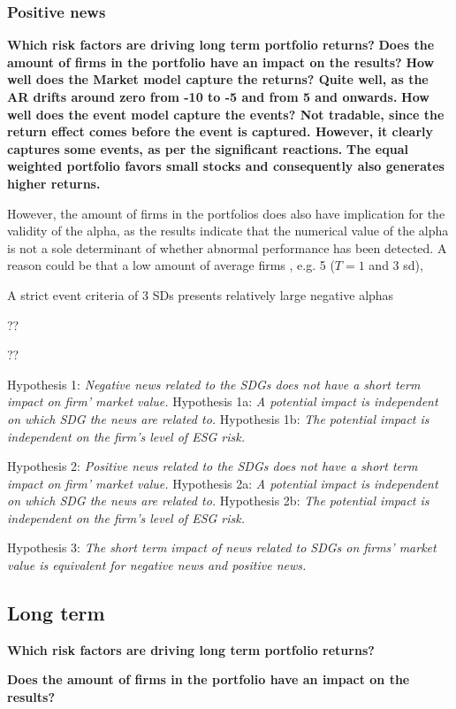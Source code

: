 \subsubsection{Positive news}


\textbf{Which risk factors are driving long term portfolio returns?}
\textbf{Does the amount of firms in the portfolio have an impact on the results?}
\textbf{How well does the Market model capture the returns? Quite well, as the AR drifts around zero from -10 to -5 and from 5 and onwards. }
\textbf{How well does the event model capture the events? Not tradable, since the return effect comes before the event is captured. However, it clearly captures some events, as per the significant reactions. }
\textbf{The equal weighted portfolio favors small stocks and consequently also generates higher returns. }



  However, the amount of firms in the portfolios does also have implication for the validity of the alpha, as the results indicate that the numerical value of the alpha is not a sole determinant of whether abnormal performance has been detected. A reason could be that a low amount of average firms , e.g. 5 ($T = 1$ and 3 sd), 

A strict event criteria of 3 SDs presents relatively large negative alphas

  ??

??










Hypothesis 1: \textit{Negative news related to the SDGs does not have a short term impact on firm' market value.
}
Hypothesis 1a: \textit{A potential impact is independent on which SDG the news are related to.}  
Hypothesis 1b: \textit{The potential impact is independent on the firm's level of ESG risk.}

Hypothesis 2: \textit{Positive news related to the SDGs does not have a short term impact on firm' market value.}
Hypothesis 2a: \textit{A potential impact is independent on which SDG the news are related to.}  
Hypothesis 2b: \textit{The potential impact is independent on the firm's level of ESG risk.}

Hypothesis 3: \textit{The short term impact of news related to SDGs on firms' market value is equivalent for negative news and positive news.}


\subsection{Long term}

\textbf{Which risk factors are driving long term portfolio returns?}


\textbf{Does the amount of firms in the portfolio have an impact on the results?}
